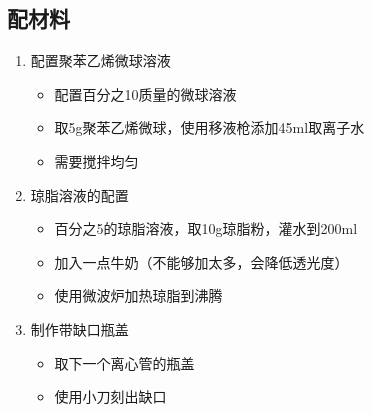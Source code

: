 \documentclass[12pt]{article}
\begin{document}
\subsection{配材料}
\begin{enumerate}
    \item 配置聚苯乙烯微球溶液
    \begin{itemize}
        \item 配置百分之10质量的微球溶液
        \item 取5g聚苯乙烯微球，使用移液枪添加45ml取离子水
        \item 需要搅拌均匀
    \end{itemize}

    \item 琼脂溶液的配置
    \begin{itemize}
        \item 百分之5的琼脂溶液，取10g琼脂粉，灌水到200ml
        \item 加入一点牛奶（不能够加太多，会降低透光度）
        \item 使用微波炉加热琼脂到沸腾
    \end{itemize}

    \item 制作带缺口瓶盖
    \begin{itemize}
        \item 取下一个离心管的瓶盖
        \item 使用小刀刻出缺口
    \end{itemize}
\end{enumerate}
\end{document}
